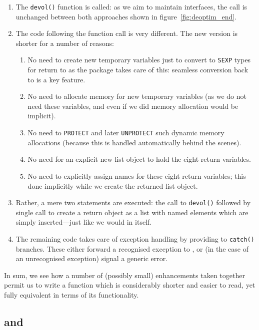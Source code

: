 \documentclass[nojss,shortnames,article]{jss}
\begin{document}
\begin{enumerate}
\item The \verb|devol()| function is called: as we aim to maintain
  interfaces, the call is unchanged between both approaches shown in
  figure~\ref{fig:deoptim_end}.
\item The code following the function call is very different.  The new
  version is shorter for a number of reasons:
  \begin{enumerate}
  \item No need to create new temporary variables just to convert to
    \texttt{SEXP} types for return to  as the  package takes
    care of this: seamless conversion back to  is a key feature.
  \item No need to allocate memory for new temporary variables (as we do not
    need these variables, and even if we did memory allocation would be implicit).
  \item No need to \texttt{PROTECT} and later \texttt{UNPROTECT} such dynamic
    memory allocations (because this is handled automatically behind the scenes).
  \item No need for an explicit new list object to hold the eight return variables.
  \item No need to explicitly assign names for these eight return
    variables; this done implicitly while we create the returned list object.
  \end{enumerate}
\item Rather, a mere two statements are executed: the call to \verb|devol()|
  followed by single call to create a return object as a list with named
  elements which are simply inserted---just like we would in  itself.
\item The remaining code takes care of exception handling by providing to
  \verb|catch()| branches. These either forward a recognised exception to
  , or (in the case of an unrecognised exception) signal a
  generic error.
\end{enumerate}

In sum, we see how a number of (possibly small) enhancements taken together
permit us to write a function which is considerably shorter and easier to read, yet
fully equivalent in terms of its functionality.

\subsection[de4_0.c and devol.cpp]{ and }
\end{document}
